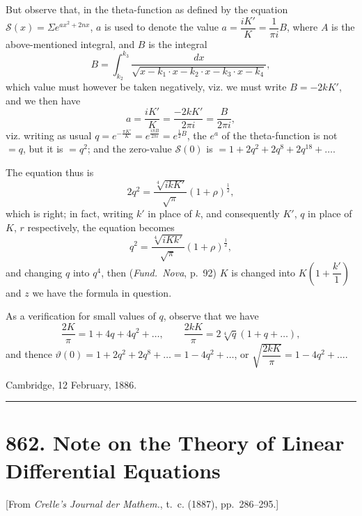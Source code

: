 \documentclass[11pt,a4paper]{book}
\begin{document}
But observe that, in the theta-function as defined by the equation $\mathcal{S}(x) = \Sigma e^{ax^2 + 2nx}$, $a$ is used to denote the value $a = \dfrac{iK'}{K} = \dfrac{1}{\pi i}B$, where $A$ is the above-mentioned integral, and $B$ is the integral
\[
B = \int_{k_2}^{k_3} \frac{dx}{\sqrt{x - k_1 \cdot x - k_2 \cdot x - k_3 \cdot x - k_4}},
\]
which value must however be taken negatively, viz. we must write $B = -2kK'$, and we then have
\[
a = \frac{iK'}{K} = \frac{-2kK'}{2\pi i} = \frac{B}{2\pi i},
\]
viz. writing as usual $q = e^{-\frac{\pi K'}{K}} = e^{\frac{i\pi B}{2\pi i}} = e^{\frac{1}{2}B}$, the $e^a$ of the theta-function is not $= q$, but it is $= q^2$; and the zero-value $\mathcal{S}(0)$ is $= 1 + 2q^2 + 2q^8 + 2q^{18} + \ldots$.

The equation thus is
\[
2q^2 = \frac{\sqrt[4]{ikK'}}{\sqrt{\pi}} (1 + \rho)^{\frac{1}{2}},
\]
which is right; in fact, writing $k'$ in place of $k$, and consequently $K'$, $q$ in place of $K$, $r$ respectively, the equation becomes
\[
q^2 = \frac{\sqrt[4]{iKk'}}{\sqrt{\pi}} (1 + \rho)^{\frac{1}{2}},
\]
and changing $q$ into $q^4$, then (\textit{Fund.~Nova}, p.~92) $K$ is changed into $K\left(1 + \dfrac{k'}{1}\right)$ and $z$ we have the formula in question.

As a verification for small values of $q$, observe that we have
\[
\frac{2K}{\pi} = 1 + 4q + 4q^2 + \ldots, \qquad \frac{2kK}{\pi} = 2\sqrt[4]{q}(1 + q + \ldots),
\]
and thence $\vartheta(0) = 1 + 2q^2 + 2q^8 + \ldots = 1 - 4q^2 + \ldots$, or $\sqrt{\dfrac{2kK}{\pi}} = 1 - 4q^2 + \ldots$.

\begin{flushright}
Cambridge, 12 February, 1886.
\end{flushright}

\vspace{12pt}
\hrule
\vspace{12pt}

\section*{862. Note on the Theory of Linear Differential Equations}

\begin{center}
[From \textit{Crelle's Journal der Mathem.}, t.~c. (1887), pp.~286--295.]
\end{center}
\end{document}
